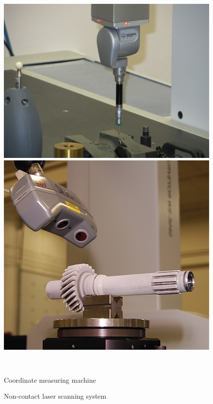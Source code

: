 \documentclass[a4paper, 11pt, reqno]{report}
\begin{document}
\begin{figure}[t]
  \centering
  \begin{minipage}[t]{0.4\textwidth}
    \includegraphics[width=\textwidth]{scanningMachine1}
  \end{minipage}
  \hfill
  \begin{minipage}[t]{0.4\textwidth}
    \includegraphics[width=\textwidth]{scanningMachine2}
  \end{minipage}
  \\[5pt]
  \begin{minipage}[b]{0.4\textwidth}
    \caption{Coordinate measuring machine}
  \end{minipage}
  \hfill
  \begin{minipage}[b]{0.4\textwidth}
    \caption{Non-contact laser scanning system}
  \end{minipage}
\end{figure}
%
\end{document}
